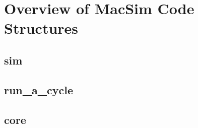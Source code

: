 
\clearpage
\section{Overview of MacSim Code Structures}
\label{sec:codetop}
\subsection{sim}
\subsection{run\_a\_cycle}
\subsection{core}
